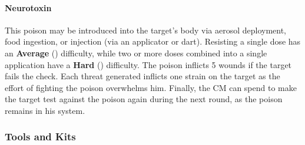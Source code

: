 \begin{multicols}{2}
\paragraph{Neurotoxin} \label{poison:neurotoxin}
This poison may be introduced into the target's body via
aerosol deployment, food ingestion, or injection (via an
applicator or dart). Resisting a single dose has an \textbf{Average} (\difficulty\difficulty)
difficulty, while two or more doses combined into a single
application have a \textbf{Hard} (\difficulty\difficulty\difficulty) difficulty.
The poison inflicts 5 wounds if the target fails the check. Each
threat generated inflicts one strain on the target as the effort
of fighting the poison overwhelms him. Finally, the CM can
spend \despair to make the target test against the poison
again during the next round, as the poison remains in his system.

\end{multicols}
\hrulefill

\subsubsection{Tools and Kits}


